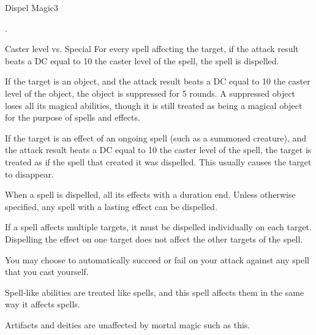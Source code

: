 \begin{spellsection}{Dispel Magic}{3}
\begin{spellheader}
    .
\end{spellheader}
\begin{spellcontent}
    \begin{spelltargetinginfo}
    \end{spelltargetinginfo}
    \begin{spelleffects}
        \begin{spellattack}{Caster level vs. Special}
            \spelleffect For every spell affecting the target, if the attack result beats a DC equal to 10 \add the caster level of the spell, the spell is dispelled.

            If the target is an object, and the attack result beats a DC equal to 10 \add the caster level of the object, the object is suppressed for 5 rounds. A suppressed object loses all its magical abilities, though it is still treated as being a magical object for the purpose of spells and effects.

            If the target is an effect of an ongoing spell (such as a summoned creature), and the attack result beats a DC equal to 10 \add the caster level of the spell, the target is treated as if the spell that created it was dispelled. This usually causes the target to disappear.
        \end{spellattack}
    \end{spelleffects}
\end{spellcontent}
\begin{spellfooter}
    \spellnotes When a spell is dispelled, all its effects with a duration end. Unless otherwise specified, any spell with a lasting effect can be dispelled.
    
    If a spell affects multiple targets, it must be dispelled individually on each target. Dispelling the effect on one target does not affect the other targets of the spell.

    You may choose to automatically succeed or fail on your attack against any spell that you cast yourself.

    Spell-like abilities are treated like spells, and this spell affects them in the same way it affects spells.

    Artifacts and deities are unaffected by mortal magic such as this.
\end{spellfooter}
\end{spellsection}

